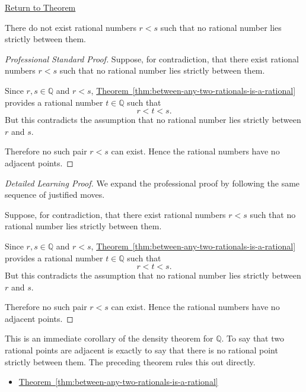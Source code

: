 \newpage
{}
\label{prf:q-has-no-adjacent-points}

\begin{remark*}[Return]
\hyperref[cor:q-has-no-adjacent-points]{Return to Theorem}
\end{remark*}

\begin{corollary*}
There do not exist rational numbers $r<s$ such that no rational number lies
strictly between them.
\end{corollary*}

\begin{proof}[Professional Standard Proof]
\LRAProofBodyStart
Suppose, for contradiction, that there exist rational numbers $r<s$ such that
no rational number lies strictly between them.

Since $r,s\in\mathbb{Q}$ and $r<s$,
\hyperref[thm:between-any-two-rationals-is-a-rational]{Theorem~\ref*{thm:between-any-two-rationals-is-a-rational}}
provides a rational number $t\in\mathbb{Q}$ such that
\[
r<t<s.
\]
But this contradicts the assumption that no rational number lies strictly
between $r$ and $s$.

Therefore no such pair $r<s$ can exist. Hence the rational numbers have no
adjacent points.
\end{proof}

\begin{proof}[Detailed Learning Proof]
\LRAProofBodyStart
We expand the professional proof by following the same sequence of justified moves.

Suppose, for contradiction, that there exist rational numbers $r<s$ such that
no rational number lies strictly between them.

Since $r,s\in\mathbb{Q}$ and $r<s$,
\hyperref[thm:between-any-two-rationals-is-a-rational]{Theorem~\ref*{thm:between-any-two-rationals-is-a-rational}}
provides a rational number $t\in\mathbb{Q}$ such that
\[
r<t<s.
\]
But this contradicts the assumption that no rational number lies strictly
between $r$ and $s$.

Therefore no such pair $r<s$ can exist. Hence the rational numbers have no
adjacent points.
\end{proof}

\begin{remark*}
This is an immediate corollary of the density theorem for $\mathbb{Q}$. To say
that two rational points are adjacent is exactly to say that there is no
rational point strictly between them. The preceding theorem rules this out
directly.
\end{remark*}

\begin{dependencies}
\begin{itemize}
  \item \hyperref[thm:between-any-two-rationals-is-a-rational]{Theorem~\ref*{thm:between-any-two-rationals-is-a-rational}}
\end{itemize}
\end{dependencies}


\clearpage
